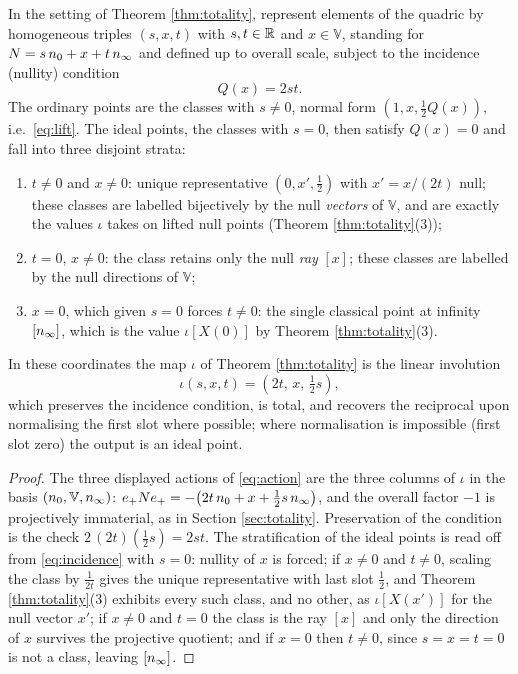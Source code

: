 \begin{proposition}\label{prop:swap}
In the setting of Theorem \ref{thm:totality}, represent elements of the quadric by homogeneous triples $(s, x, t)$ with $s,t \in \mathbb{R}$ and $x \in \mathbb{V}$, standing for $N = s\,n_0 + x + t\,n_\infty$ and defined up to overall scale, subject to the incidence (nullity) condition
\begin{equation}\label{eq:incidence}
Q(x) = 2st .
\end{equation}
The ordinary points are the classes with $s \neq 0$, normal form $(1, x, \tfrac12 Q(x))$, i.e.\ \eqref{eq:lift}. The ideal points, the classes with $s = 0$, then satisfy $Q(x) = 0$ and fall into three disjoint strata:
\begin{enumerate}
\item[(i)] $t \neq 0$ and $x \neq 0$: unique representative $(0, x', \tfrac12)$ with $x' = x/(2t)$ null; these classes are labelled bijectively by the null \emph{vectors} of $\mathbb{V}$, and are exactly the values $\iota$ takes on lifted null points (Theorem \ref{thm:totality}(3));
\item[(ii)] $t = 0$, $x \neq 0$: the class retains only the null \emph{ray} $[x]$; these classes are labelled by the null directions of $\mathbb{V}$;
\item[(iii)] $x = 0$, which given $s = 0$ forces $t \neq 0$: the single classical point at infinity $[n_\infty]$, which is the value $\iota[X(0)]$ by Theorem \ref{thm:totality}(3).
\end{enumerate}
In these coordinates the map $\iota$ of Theorem \ref{thm:totality} is the linear involution
\[
\iota(s, x, t) = (2t,\, x,\, \tfrac12 s),
\]
which preserves the incidence condition, is total, and recovers the reciprocal upon normalising the first slot where possible; where normalisation is impossible (first slot zero) the output is an ideal point.
\end{proposition}

\begin{proof}
The three displayed actions of \eqref{eq:action} are the three columns of $\iota$ in the basis $(n_0, \mathbb{V}, n_\infty)$: $e_+ N e_+ = -\bigl(2t\,n_0 + x + \tfrac12 s\,n_\infty\bigr)$, and the overall factor $-1$ is projectively immaterial, as in Section \ref{sec:totality}. Preservation of the condition is the check $2\,(2t)(\tfrac12 s) = 2st$. The stratification of the ideal points is read off from \eqref{eq:incidence} with $s = 0$: nullity of $x$ is forced; if $x \neq 0$ and $t \neq 0$, scaling the class by $\tfrac{1}{2t}$ gives the unique representative with last slot $\tfrac12$, and Theorem \ref{thm:totality}(3) exhibits every such class, and no other, as $\iota[X(x')]$ for the null vector $x'$; if $x \neq 0$ and $t = 0$ the class is the ray $[x]$ and only the direction of $x$ survives the projective quotient; and if $x = 0$ then $t \neq 0$, since $s = x = t = 0$ is not a class, leaving $[n_\infty]$.
\end{proof}

